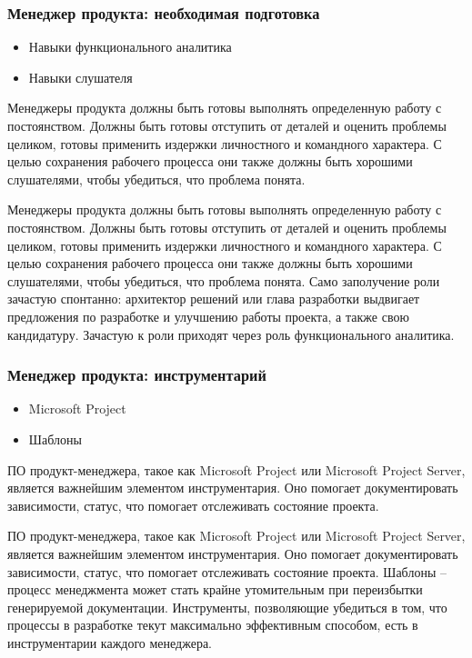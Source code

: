 \documentclass{../industrial-development}
\begin{document}
\begin{frame} \frametitle{Менеджер продукта: необходимая подготовка}
  \begin{itemize}
  \item Навыки функционального аналитика
  \item Навыки слушателя
  \end{itemize}
\begin{block}{}
	\alert {}Менеджеры продукта должны быть готовы выполнять определенную работу с постоянством. Должны быть готовы отступить от деталей и оценить проблемы целиком, готовы применить издержки личностного и командного характера. 
	С целью сохранения рабочего процесса они также должны быть хорошими слушателями, чтобы убедиться, что проблема понята. 
\end{block}
\end{frame}

\lecturenotes

Менеджеры продукта должны быть готовы выполнять определенную работу с постоянством. Должны быть готовы отступить от деталей и оценить проблемы целиком, готовы применить издержки личностного и командного характера. 
С целью сохранения рабочего процесса они также должны быть хорошими слушателями, чтобы убедиться, что проблема понята. 
Само заполучение роли зачастую спонтанно: архитектор решений или глава разработки выдвигает предложения по разработке и улучшению работы проекта, а также свою кандидатуру. Зачастую к роли приходят через роль функционального аналитика. 
  ~\cite{Anatomy}

\begin{frame} \frametitle{Менеджер продукта: инструментарий}
  \begin{itemize}
  \item Microsoft Project
  \item Шаблоны
  \end{itemize}

\begin{block}{}
	\alert {}ПО продукт-менеджера, такое как Microsoft Project или Microsoft Project Server, является важнейшим элементом инструментария. Оно помогает документировать зависимости, статус, что помогает отслеживать состояние проекта. 
\end{block}

\end{frame}

\lecturenotes

ПО продукт-менеджера, такое как Microsoft Project или Microsoft Project Server, является важнейшим элементом инструментария. Оно помогает документировать зависимости, статус, что помогает отслеживать состояние проекта. 
Шаблоны – процесс менеджмента может стать крайне утомительным при переизбытки генерируемой документации. Инструменты, позволяющие убедиться в том, что процессы в разработке текут максимально эффективным способом, есть в инструментарии каждого менеджера. 
  ~\cite{Anatomy}
\end{document}
